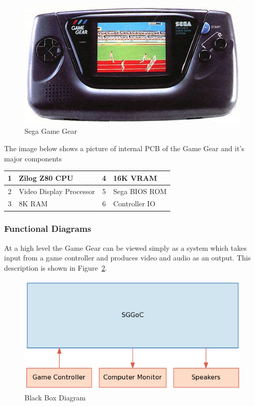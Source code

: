 \documentclass{article}
\begin{document}
\begin{figure}[H]
\centering
\includegraphics[scale=0.4]{../images/gamegear.png}
\caption{Sega Game Gear \protect\cite{gg}}
\label{fig:gg}
\end{figure}

The image below shows a picture of internal PCB of the Game Gear and it's major
components

\begin{table}[H]
    \centering
    \begin{tabular}{|c|l|c|l|}
        \hline
        1 & Zilog Z80 CPU           & 4 & 16K VRAM      \\ \hline
        2 & Video Display Processor & 5 & Sega BIOS ROM \\ \hline
        3 & 8K RAM                  & 6 & Controller IO \\
        \hline
    \end{tabular}
\end{table}

\newpage
\subsubsection{Functional Diagrams}
At a high level the Game Gear can be viewed simply as a system which takes
input from a game controller and produces video and audio as an output. This
description is shown in Figure~\ref{fig:external}.

\begin{figure}[H]
\centering
\includegraphics[scale=0.4]{../block_diagrams/block_diagram_external.png}
\caption{Black Box Diagram}
\label{fig:external}
\end{figure}
\end{document}

